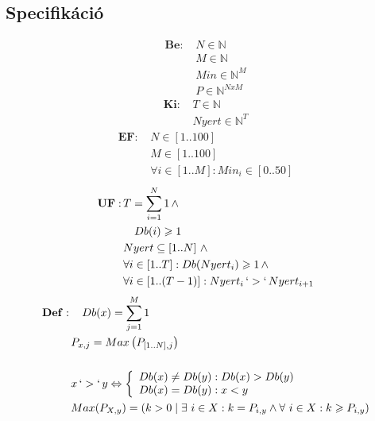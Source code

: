 \documentclass[a4paper]{article}
\begin{document}
    \subsection{Specifikáció}
    \begin{align*}
      \mathbf{Be:}\, &N \in \mathbb{N} \\
      &M \in \mathbb{N} \\
      &Min \in \mathbb{N}^M \\
      &P \in \mathbb{N}^{NxM}
    \end{align*}
    \begin{align*}
      \mathbf{Ki:}\, &T \in \mathbb{N} \\
      &Nyert \in \mathbb{N}^T
    \end{align*}
    \begin{align*}
      \mathbf{EF:}\, &N \in \left [ 1 .. 100 \right ] \\
      &M \in \left [ 1 .. 100 \right ] \\
      &\forall i \in \left [ 1 .. M \right ] : Min_i \in \left [ 0 .. 50 \right ]
    \end{align*}
    \begin{align*}
      \mathbf{UF:}\, & T=\sum_{i=1}^{N}1 \, \wedge \\
      &\quad Db(i) \geqslant 1 \\
      &Nyert \subseteq \left [ 1 .. N \right ] \, \wedge \\
      &\forall i \in \left [ 1 .. T \right ] : Db(Nyert_i) \geqslant 1 \, \wedge \\
      &\forall i \in \left[ 1 .. (T-1) \right ] : Nyert_i \, `>` \, Nyert_{i+1}
    \end{align*}
    \begin{align*}
      \mathbf{Def:}\, &\quad Db(x)=\sum_{j=1}^{M}1   \\
      &P_{x,j}=Max\left(P_{\left [ 1..N \right ],j}\right) \\
      \\
      &x \, `>` \, y \Leftrightarrow \left\{
                \begin{array}{ll}
                  Db(x) \neq Db(y) : Db(x) > Db(y)\\
                  Db(x) = Db(y) : x < y\\
                \end{array}
              \right. \\
      &Max(P_{X,y})=\left (k > 0\mid \exists \ i\in X: k= P_{i,y} \wedge \forall \ i \in X: k \geqslant P_{i,y} \right )
    \end{align*}
\end{document}
